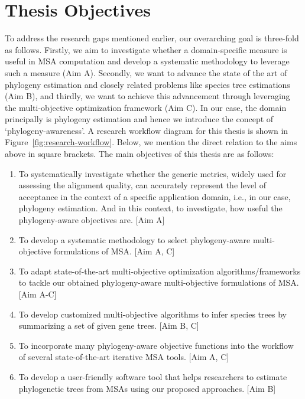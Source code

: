 \section{Thesis Objectives}

To address the research gaps mentioned earlier, our overarching goal is three-fold as follows. Firstly, we aim to investigate whether a domain-specific measure is useful in MSA computation and develop a systematic methodology to leverage such a measure (Aim A). Secondly, we want to advance the state of the art of phylogeny estimation and closely related problems like species tree estimations (Aim B), and thirdly, we want to achieve this advancement through leveraging the multi-objective optimization framework (Aim C). In our case, the domain principally is phylogeny estimation and hence we introduce the concept of ‘phylogeny-awareness’. A research workflow diagram for this thesis is shown in Figure~\ref{fig:research-workflow}. Below, we mention the direct relation to the aims above in square brackets. The main objectives of this thesis are as follows:

\begin{enumerate}
\item To systematically investigate whether the generic metrics, widely used for assessing the alignment quality, can accurately represent the level of acceptance in the context of a specific application domain, i.e., in our case, phylogeny estimation. And in this context, to investigate, how useful the phylogeny-aware objectives are. [Aim A]

\item To develop a systematic methodology to select phylogeny-aware multi-objective formulations of MSA. [Aim A, C]

\item To adapt state-of-the-art multi-objective optimization algorithms/frameworks to tackle our obtained phylogeny-aware multi-objective formulations of MSA. [Aim A-C]

\item To develop customized multi-objective algorithms to infer species trees by summarizing a set of given gene trees. [Aim B, C]

\item To incorporate many phylogeny-aware objective functions into the workflow of several state-of-the-art iterative MSA tools. [Aim A, C]

\item To develop a user-friendly software tool that helps researchers to estimate phylogenetic trees from MSAs using our proposed approaches. [Aim B]
\end{enumerate}

